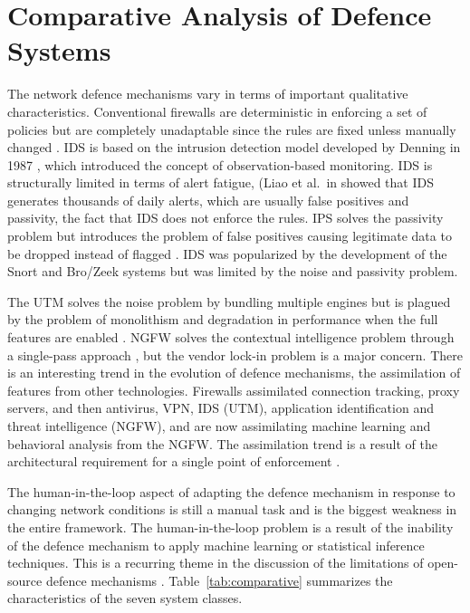 \documentclass[conference]{IEEEtran}
\begin{document}
\section{Comparative Analysis of Defence Systems}
\label{sec:comparative}

The network defence mechanisms vary in terms of important qualitative characteristics. Conventional firewalls are deterministic in enforcing a set of policies but are completely unadaptable since the rules are fixed unless manually changed \cite{scarfone2009nist}. IDS is based on the intrusion detection model developed by Denning in 1987 \cite{denning1987ids}, which introduced the concept of observation-based monitoring. IDS is structurally limited in terms of alert fatigue, (Liao et al.\ in \cite{liao2013ids}showed that IDS generates thousands of daily alerts, which are usually false positives and passivity, the fact that IDS does not enforce the rules. IPS solves the passivity problem but introduces the problem of false positives causing legitimate data to be dropped instead of flagged \cite{khraisat2019ids}. IDS was popularized by the development of the Snort \cite{roesch1999snort} and Bro/Zeek \cite{paxson1999bro} systems but was limited by the noise and passivity problem.

The UTM solves the noise problem by bundling multiple engines but is plagued by the problem of monolithism and degradation in performance when the full features are enabled \cite{neupane2018ngfw}. NGFW solves the contextual intelligence problem through a single-pass approach \cite{liang2022evolution},  but the vendor lock-in problem is a major concern. There is an interesting trend in the evolution of defence mechanisms, the assimilation of features from other technologies. Firewalls assimilated connection tracking, proxy servers, and then antivirus, VPN, IDS (UTM), application identification and threat intelligence (NGFW), and are now assimilating machine learning and behavioral analysis from the NGFW. The assimilation trend is a result of the architectural requirement for a single point of enforcement \cite{neupane2018ngfw}.

The human-in-the-loop aspect of adapting the defence mechanism in response to changing network conditions is still a manual task and is the biggest weakness in the entire framework. The human-in-the-loop problem is a result of the inability of the defence mechanism to apply machine learning or statistical inference techniques. This is a recurring theme in the discussion of the limitations of open-source defence mechanisms \cite{ahmad2021nids, dini2023overview}. Table~\ref{tab:comparative} summarizes the characteristics of the seven system classes.
\end{document}

